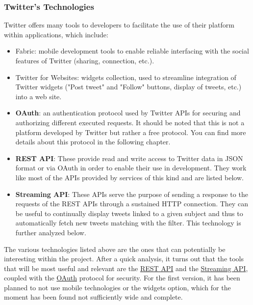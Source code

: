 \documentclass[a4paper,11pt]{report}
\begin{document}
\subsubsection{Twitter's Technologies}
Twitter offers many tools to developers to facilitate the use of their platform within applications, which include:
\begin{itemize}
	\item Fabric: mobile development tools to enable reliable interfacing with the social features of Twitter (sharing, connection, etc.).
	\item Twitter for Websites: widgets collection, used to streamline integration of Twitter widgets ("Post tweet" and "Follow" buttons, display of tweets, etc.) into a web site.
	\item \textbf{OAuth}: an authentication protocol used by Twitter APIs for securing and authorizing different executed requests. It should be noted that this is not a platform developed by Twitter but rather a free protocol. You can find more details about this protocol in the following chapter.
	\item \textbf{REST API}: These provide read and write access to Twitter data in JSON format or via OAuth in order to enable their use in development. They work like most of the APIs provided by services of this kind and are listed below.
	\item \textbf{Streaming API}: These APIs serve the purpose of sending a response to the requests of the REST APIs through a sustained HTTP connection. They can be useful to continually display tweets linked to a given subject and thus to automatically fetch new tweets matching with the filter. This technology is further analyzed below.
\end{itemize}

The various technologies listed above are the ones that can potentially be interesting within the project. After a quick analysis, it turns out that the tools that will be most useful and relevant are the \underline{REST API} and the \underline{Streaming API}, coupled with the \underline{OAuth} protocol for security. For the first version, it has been planned to not use mobile technologies or the widgets option, which for the moment has been found not sufficiently wide and complete.
\newpage
\end{document}
